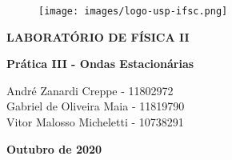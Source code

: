 \thispagestyle{empty}

\begin{figure}
  \centering
  \texttt{[image: images/logo-usp-ifsc.png]}
  \vspace*{-0.3cm}
\end{figure}

\begin{center}
{\large \rm \textbf {LABORATÓRIO DE FÍSICA II} \linebreak}
\end{center}

\baselineskip 30pt

\vspace*{0.3cm}

\begin{center}
{\LARGE \bfseries Prática III - Ondas Estacionárias}
\end{center}

\vspace*{1cm}

\setcounter{footnote}{1}

\renewcommand{\thefootnote}{\fnsymbol{footnote}}
\begin{center}
{
    \sc  André Zanardi Creppe - 11802972 \\
    \sc  Gabriel de Oliveira Maia - 11819790 \\
    \sc  Vitor Malosso Micheletti - 10738291 \\
}
\vspace*{0.5cm}

\vspace*{-.5cm}
\end{center}


\baselineskip 17pt

\vspace*{1.5cm}
\begin{center}
{{\bf Outubro de 2020}}
\end{center}

\vspace*{.05cm}

\renewcommand{\thefootnote}{\arabic{footnote}}

\setcounter{footnote}{1}

\pagebreak

\baselineskip 19pt
